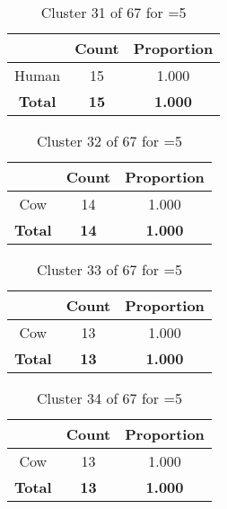 \begin{table}[ht!]
\centering
\begin{tabular}{|c|c|c|}
\hline
\bf \Spec{} &\bf Count &\bf Proportion\\ \hline \hline
Human & 15 & 1.000\\ \hline
\hline
\bf Total & \bf 15 & \bf 1.000\\ \hline
\end{tabular}
\label{tab:cluster:31:5}
\caption{Cluster 31 of 67 for \minneigh{}=5}
\end{table}

\begin{table}[ht!]
\centering
\begin{tabular}{|c|c|c|}
\hline
\bf \Spec{} &\bf Count &\bf Proportion\\ \hline \hline
Cow & 14 & 1.000\\ \hline
\hline
\bf Total & \bf 14 & \bf 1.000\\ \hline
\end{tabular}
\label{tab:cluster:32:5}
\caption{Cluster 32 of 67 for \minneigh{}=5}
\end{table}

\begin{table}[ht!]
\centering
\begin{tabular}{|c|c|c|}
\hline
\bf \Spec{} &\bf Count &\bf Proportion\\ \hline \hline
Cow & 13 & 1.000\\ \hline
\hline
\bf Total & \bf 13 & \bf 1.000\\ \hline
\end{tabular}
\label{tab:cluster:33:5}
\caption{Cluster 33 of 67 for \minneigh{}=5}
\end{table}

\begin{table}[ht!]
\centering
\begin{tabular}{|c|c|c|}
\hline
\bf \Spec{} &\bf Count &\bf Proportion\\ \hline \hline
Cow & 13 & 1.000\\ \hline
\hline
\bf Total & \bf 13 & \bf 1.000\\ \hline
\end{tabular}
\label{tab:cluster:34:5}
\caption{Cluster 34 of 67 for \minneigh{}=5}
\end{table}

